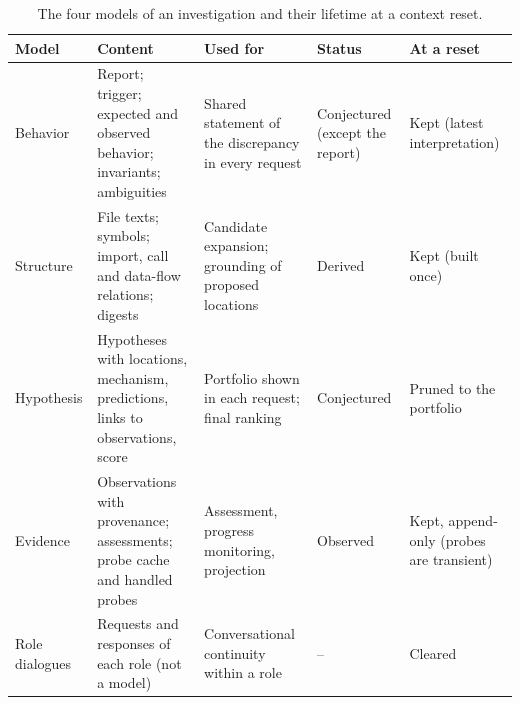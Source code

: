 \documentclass[a4paper,fleqn]{cas-sc}
\begin{document}
\begin{table}[width=\FullWidth,pos=!htbp]
\caption{The four models of an investigation and their lifetime at a context reset.}\label{tab:models}
\centering\small\setlength{\tabcolsep}{3pt}
\renewcommand{\arraystretch}{1.12}
\begin{tabular}{@{}>{\raggedright\arraybackslash}p{}>{\raggedright\arraybackslash}p{}>{\raggedright\arraybackslash}p{}>{\raggedright\arraybackslash}p{}>{\raggedright\arraybackslash}p{}@{}}\toprule
Model & Content & Used for & Status & At a reset\\\midrule
Behavior & Report; trigger; expected and observed behavior; invariants; ambiguities & Shared statement of the discrepancy in every request & Conjectured (except the report) & Kept (latest interpretation)\\
Structure & File texts; symbols; import, call and data-flow relations; digests & Candidate expansion; grounding of proposed locations & Derived & Kept (built once)\\
Hypothesis & Hypotheses with locations, mechanism, predictions, links to observations, score & Portfolio shown in each request; final ranking & Conjectured & Pruned to the portfolio\\
Evidence & Observations with provenance; assessments; probe cache and handled probes & Assessment, progress monitoring, projection & Observed & Kept, append-only (probes are transient)\\
\midrule
Role dialogues & Requests and responses of each role (not a model) & Conversational continuity within a role & -- & Cleared\\
\bottomrule\end{tabular}
\end{table}
\end{document}
